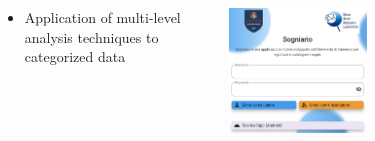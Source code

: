 \begin{minipage}[t]{\textwidth}
    \begin{columns}
        \begin{column}{0.5\textwidth}
        \begin{itemize}
            \item Application of multi-level analysis techniques to categorized data
        \end{itemize}
        \end{column}
    \begin{column}{0.5\textwidth}
        \centering
        \includegraphics[width=0.5\textwidth]{immagini/sogniario}
    \end{column}
\end{columns}
\end{minipage}